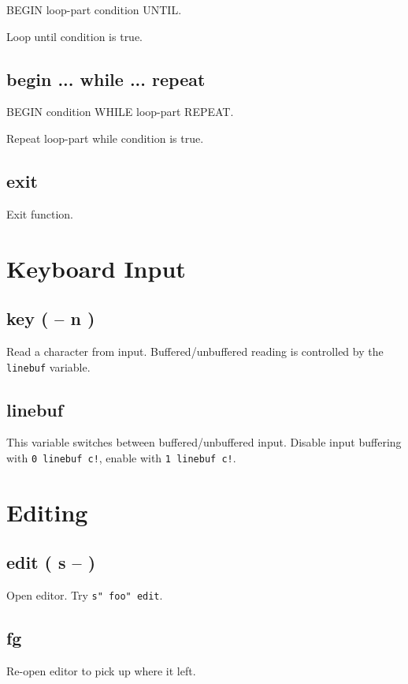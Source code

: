 BEGIN loop-part condition UNTIL.

Loop until condition is true.

\subsection{begin ... while ... repeat}

BEGIN condition WHILE loop-part REPEAT.

Repeat loop-part while condition is true.

\subsection{exit}

Exit function.


\section{Keyboard Input}

\subsection{key ( -- n )}

Read a character from input. Buffered/unbuffered reading is controlled by the \texttt{linebuf} variable.

\subsection{linebuf}

This variable switches between buffered/unbuffered input. Disable input buffering with \texttt{0 linebuf c!}, enable with \texttt{1 linebuf c!}.


\section{Editing}

\subsection{edit ( s -- )}

Open editor. Try \texttt{s" foo" edit}.

\subsection{fg}

Re-open editor to pick up where it left.


